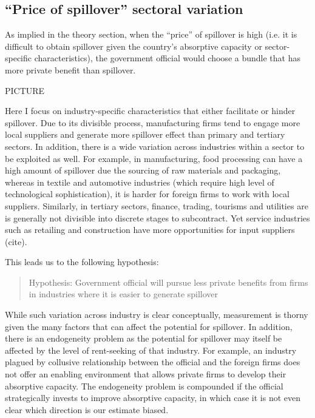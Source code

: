 \subsection{``Price of spillover'' sectoral variation}

As implied in the theory section, when the ``price'' of spillover is high (i.e. it is difficult to obtain spillover given the country's absorptive capacity or sector-specific characteristics), the government official would choose a bundle that has more private benefit than spillover. 

PICTURE

Here I focus on industry-specific characteristics that either facilitate or hinder spillover. Due to its divisible process, manufacturing firms tend to engage more local suppliers and generate more spillover effect than primary and tertiary sectors. In addition, there is a wide variation across industries within a sector to be exploited as well. For example, in manufacturing, food processing can have a high amount of spillover due the sourcing of raw materials and packaging, whereas in textile and automotive industries (which require high level of technological sophistication), it is harder for foreign firms to work with local suppliers. Similarly, in tertiary sectors, finance, trading, tourisms and utilities are is generally not divisible into discrete stages to subcontract. Yet service industries such as retailing and construction have more opportunities for input suppliers (cite).

This leads us to the following hypothesis:

\begin{quote}
Hypothesis: Government official will pursue less private benefits from firms in industries where it is easier to generate spillover
\end{quote}

While such variation across industry is clear conceptually, measurement is thorny given the many factors that can affect the potential for spillover. In addition, there is an endogeneity problem as the potential for spillover may itself be affected by the level of rent-seeking of that industry. For example, an industry plagued by collusive relationship between the official and the foreign firms does not offer an enabling environment that allows private firms to develop their absorptive capacity. The endogeneity problem is compounded if the official strategically invests to improve absorptive capacity, in which case it is not even clear which direction is our estimate biased.

